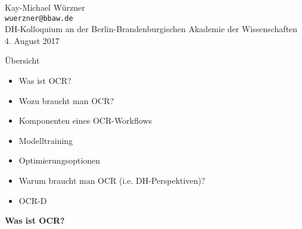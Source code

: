 \documentclass{bbawslides}
\begin{document}
\providecommand{\Title}{}


\begin{bbawtitle}
  \vspace*{3em}%
  Kay-Michael Würzner\\[-.25em]%
  \textcolor{urlColor}{\texttt{{\small wuerzner@bbaw.de}}}
  \\[3em]
  {\footnotesize{%
    DH-Kolloquium an der Berlin-Brandenburgischen Akademie der Wissenschaften\\%
    4. August 2017\\%
  }}
\end{bbawtitle}
\slideStyleFrame

\renewcommand{\footerText}{\tiny 4. August 2017, DH-Kolloquium, BBAW}

\begin{bbawslide}{Übersicht}
  \vspace*{7mm}%
  \centerslidestrue%
  \begin{itemize}
  \item Was ist OCR?
  \item Wozu braucht man OCR?
  \item Komponenten eines OCR-Workflows
  \item Modelltraining
  \item Optimierungsoptionen
  \item Warum braucht man OCR (i.e. DH-Perspektiven)?
  \item OCR-D
  \end{itemize}
\end{bbawslide}

\begin{bbawpart}{\Large\bf Was ist OCR?}
\end{bbawpart}
\end{document}
